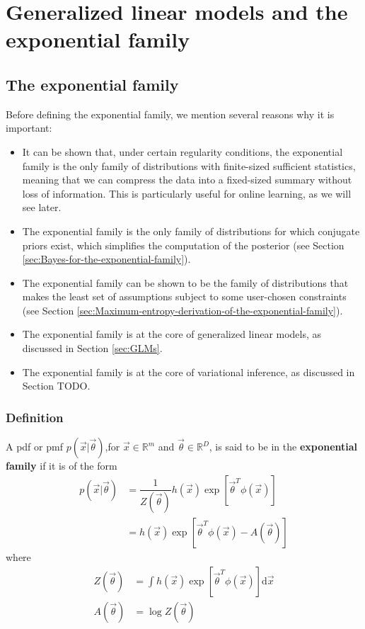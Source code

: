 \chapter{Generalized linear models and the exponential family}
\label{chap:GLM}


\section{The exponential family}
\label{sec:exponential-family}

Before defining the exponential family, we mention several reasons why it is important:
\begin{itemize}
\item{It can be shown that, under certain regularity conditions, the exponential family is the only family of distributions with finite-sized sufficient statistics, meaning that we can compress the data into a fixed-sized summary without loss of information. This is particularly useful for online learning, as we will see later.}
\item{The exponential family is the only family of distributions for which conjugate priors exist, which simplifies the computation of the posterior (see Section \ref{sec:Bayes-for-the-exponential-family}).}
\item{The exponential family can be shown to be the family of distributions that makes the least set of assumptions subject to some user-chosen constraints (see Section \ref{sec:Maximum-entropy-derivation-of-the-exponential-family}).}
\item{The exponential family is at the core of generalized linear models, as discussed in Section \ref{sec:GLMs}.}
\item{The exponential family is at the core of variational inference, as discussed in Section TODO.}
\end{itemize}


\subsection{Definition}
A pdf or pmf $p(\vec{x}|\vec{\theta})$,for $\vec{x} \in \mathbb{R}^m$ and $\vec{\theta} \in \mathbb{R}^D$, is said to be in the \textbf{exponential family} if it is of the form
\begin{align}
p(\vec{x}|\vec{\theta}) & =\dfrac{1}{Z(\vec{\theta})}h(\vec{x})\exp[\vec{\theta}^T\phi(\vec{x})] \\
    & = h(\vec{x})\exp[\vec{\theta}^T\phi(\vec{x})-A(\vec{\theta})] \label{eqn:exponential-family}
\end{align}
where
\begin{align}
Z(\vec{\theta}) & =\int h(\vec{x})\exp[\vec{\theta}^T\phi(\vec{x})]\mathrm{d}\vec{x} \\
A(\vec{\theta}) & =\log Z(\vec{\theta})
\end{align}


